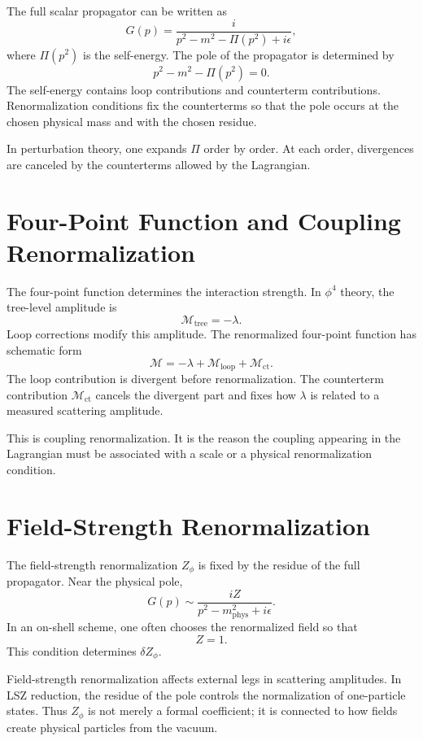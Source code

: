 The full scalar propagator can be written as
\[
    G(p)=\frac{i}{p^2-m^2-\Pi(p^2)+i\epsilon},
\]
where \(\Pi(p^2)\) is the self-energy. The pole of the propagator is determined
by
\[
    p^2-m^2-\Pi(p^2)=0.
\]
The self-energy contains loop contributions and counterterm contributions.
Renormalization conditions fix the counterterms so that the pole occurs at the
chosen physical mass and with the chosen residue.

In perturbation theory, one expands \(\Pi\) order by order. At each order,
divergences are canceled by the counterterms allowed by the Lagrangian.

\section{Four-Point Function and Coupling Renormalization}

The four-point function determines the interaction strength. In \(\phi^4\)
theory, the tree-level amplitude is
\[
    \mathcal{M}_{\mathrm{tree}}=-\lambda.
\]
Loop corrections modify this amplitude. The renormalized four-point function has
schematic form
\[
    \mathcal{M}
    = -\lambda+\mathcal{M}_{\mathrm{loop}}+\mathcal{M}_{\mathrm{ct}}.
\]
The loop contribution is divergent before renormalization. The counterterm
contribution \(\mathcal{M}_{\mathrm{ct}}\) cancels the divergent part and fixes
how \(\lambda\) is related to a measured scattering amplitude.

This is coupling renormalization. It is the reason the coupling appearing in the
Lagrangian must be associated with a scale or a physical renormalization
condition.

\section{Field-Strength Renormalization}

The field-strength renormalization \(Z_\phi\) is fixed by the residue of the full
propagator. Near the physical pole,
\[
    G(p)\sim \frac{iZ}{p^2-m_{\mathrm{phys}}^2+i\epsilon}.
\]
In an on-shell scheme, one often chooses the renormalized field so that
\[
    Z=1.
\]
This condition determines \(\delta Z_\phi\).

Field-strength renormalization affects external legs in scattering amplitudes.
In LSZ reduction, the residue of the pole controls the normalization of
one-particle states. Thus \(Z_\phi\) is not merely a formal coefficient; it is
connected to how fields create physical particles from the vacuum.

